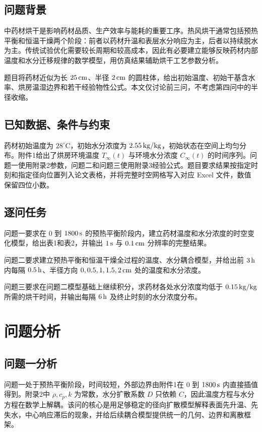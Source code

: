 \documentclass[UTF8,a4paper,12pt]{ctexart}
\numberwithin{equation}{section}
\begin{document}
\subsection{问题背景}
中药材烘干是影响药材品质、生产效率与能耗的重要工序。热风烘干通常包括预热平衡和恒温干燥两个阶段：前者以药材升温和表层水分响应为主，后者以持续脱水为主。传统试验优化需要较长周期和较高成本，因此有必要建立能够反映药材内部温度和水分迁移规律的数学模型，用仿真结果辅助烘干工艺参数分析。

题目将药材近似为长 $25\rm\,cm$、半径 $2\rm\,cm$ 的圆柱体，给出初始温度、初始干基含水率、烘房温湿边界和若干经验物性公式。本文仅讨论前三问，不考虑第四问中的半径收缩。

\subsection{已知数据、条件与约束}
药材初始温度为 $28^\circ\mathrm C$，初始水分浓度为 $2.55\rm\,kg/kg$，初始状态在空间上均匀分布。附件1给出了烘房环境温度 $T_\infty(t)$ 与环境水分浓度 $C_\infty(t)$ 的时间序列。问题一使用附录2参数，问题二和问题三使用附录3经验公式。题目要求结果按指定时刻和指定径向位置列入论文表格，并将完整时空网格写入对应 Excel 文件，数值保留四位小数。

\subsection{逐问任务}
问题一要求在 $0$ 到 $1800\rm\,s$ 的预热平衡阶段内，建立药材温度和水分浓度的时空变化模型，给出表1和表2，并输出 $1\rm\,s$ 与 $0.1\rm\,cm$ 分辨率的完整结果。

问题二要求建立预热平衡和恒温干燥全过程的温度、水分耦合模型，并给出前 $3\rm\,h$ 内每隔 $0.5\rm\,h$、半径方向 $0,0.5,1,1.5,2\rm\,cm$ 处的温度和水分浓度。

问题三要求在问题二模型基础上继续积分，求药材各处水分浓度均低于 $0.15\rm\,kg/kg$ 所需的烘干时间，并输出每隔 $6\rm\,h$ 及终止时刻的水分浓度分布。

\section{问题分析}
\subsection{问题一分析}
问题一处于预热平衡阶段，时间较短，外部边界由附件1在 $0$ 到 $1800\rm\,s$ 内直接插值得到。附录2中 $\rho,c_p,k$ 为常数，水分扩散系数 $D$ 只依赖 $C$，因此温度方程与水分方程在数学上解耦。该问的核心是用足够稳定的径向扩散模型解释表面先升温、先失水，中心响应滞后的现象，并给后续耦合模型提供统一的几何、边界和离散框架。
\end{document}
